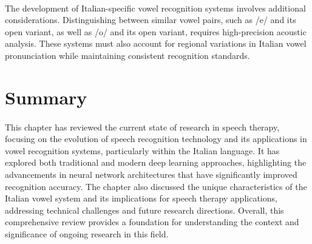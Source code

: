 \paragraph{}
The development of Italian-specific vowel recognition systems involves additional considerations. Distinguishing between similar vowel pairs, such as /e/ and its open variant, as well as /o/ and its open variant, requires high-precision acoustic analysis. These systems must also account for regional variations in Italian vowel pronunciation while maintaining consistent recognition standards.

\section{Summary}
\label{sec:summary}

\vspace{0.5cm}

\paragraph{}
This chapter has reviewed the current state of research in speech therapy, focusing on the evolution of speech recognition technology and its applications in vowel recognition systems, particularly within the Italian language. It has explored both traditional and modern deep learning approaches, highlighting the advancements in neural network architectures that have significantly improved recognition accuracy. The chapter also discussed the unique characteristics of the Italian vowel system and its implications for speech therapy applications, addressing technical challenges and future research directions. Overall, this comprehensive review provides a foundation for understanding the context and significance of ongoing research in this field.

